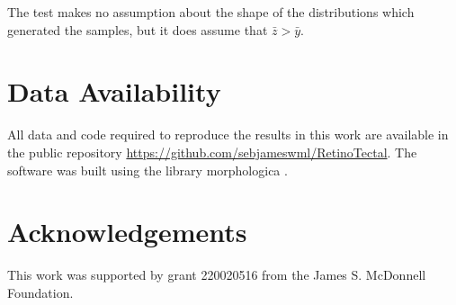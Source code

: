 \documentclass[9pt,lineno]{elife}
\begin{document}
The test makes no assumption about the shape of the distributions which generated the samples, but it does assume that $\bar{z} > \bar{y}$.

\section{Data Availability}

All data and code required to reproduce the results in this work are available in the public repository 
\url{https://github.com/sebjameswml/RetinoTectal}.
The software was built using the library morphologica \citep{james_morphologica_2022}.

\section{Acknowledgements}

This work was supported by grant 220020516 from the James S. McDonnell Foundation.



%
%
\end{document}
